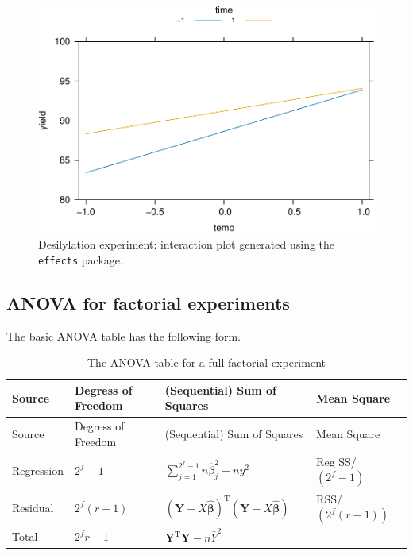 \documentclass[
]{book}
\theoremstyle{definition}
\theoremstyle{definition}
\theoremstyle{definition}
\theoremstyle{definition}
\theoremstyle{remark}
\begin{document}
\begin{figure}
\centering
\includegraphics{bookdown_math3014-6027_files/figure-latex/desilylation-effects-1.pdf}
\caption{\label{fig:desilylation-effects}Desilylation experiment: interaction plot generated using the \texttt{effects} package.}
\end{figure}

\hypertarget{anova-for-factorial-experiments}{%
\subsection{ANOVA for factorial experiments}\label{anova-for-factorial-experiments}}

The basic ANOVA table has the following form.

\begin{longtable}[]{@{}
  >{\raggedright\arraybackslash}p{}
  >{\raggedright\arraybackslash}p{}
  >{\raggedright\arraybackslash}p{}
  >{\raggedright\arraybackslash}p{}@{}}
\caption{\label{tab:anova-fact} The ANOVA table for a full factorial experiment}\tabularnewline
\toprule
Source & Degress of Freedom & (Sequential) Sum of Squares & Mean Square \\
\midrule
\endfirsthead
\toprule
Source & Degress of Freedom & (Sequential) Sum of Squares & Mean Square \\
\midrule
\endhead
Regression & \(2^f-1\) & \(\sum_{j=1}^{2^f-1}n\hat{\beta}_j^2 - n\bar{y}^2\) & Reg SS/\((2^f-1)\) \\
Residual & \(2^f(r-1)\) & \((\boldsymbol{Y}-X\hat{\boldsymbol{\beta}})^{\textrm{T}}(\boldsymbol{Y}-X\hat{\boldsymbol{\beta}})\) & RSS/\((2^f(r-1))\) \\
Total & \(2^fr-1\) & \(\boldsymbol{Y}^{\textrm{T}}\boldsymbol{Y}-n\bar{Y}^{2}\) & \\
\bottomrule
\end{longtable}
\end{document}
